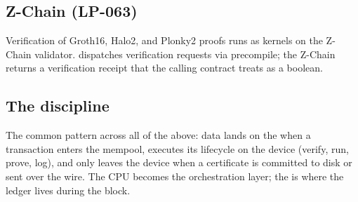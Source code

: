 \subsection{Z-Chain \ZKP{} (LP-063)}

Verification of Groth16, Halo2, and Plonky2 proofs runs as \GPU{}
kernels on the Z-Chain validator. \Zoo{} dispatches verification
requests via precompile; the Z-Chain returns a verification receipt
that the calling \Zoo{} contract treats as a boolean.

\subsection{The discipline}

The common pattern across all of the above: data lands on the \GPU{}
when a transaction enters the mempool, executes its lifecycle on
the device (verify, run, prove, log), and only leaves the device
when a certificate is committed to disk or sent over the wire.
The CPU becomes the orchestration layer; the \GPU{} is where the
ledger lives during the block.
